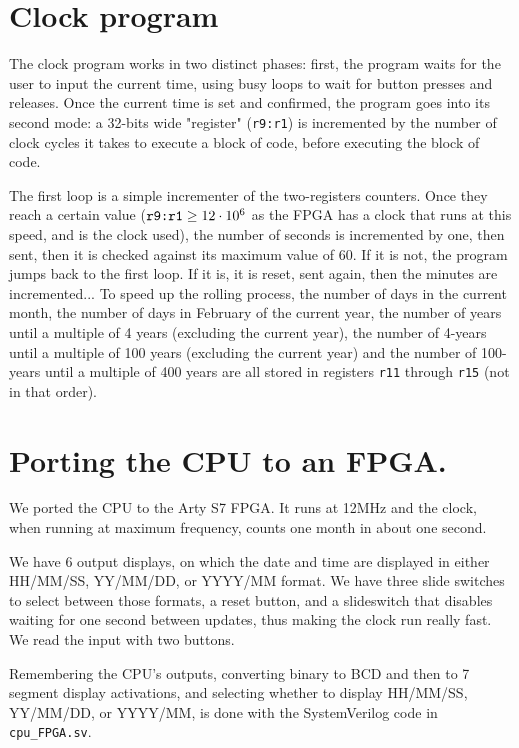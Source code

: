 \documentclass{scrartcl}
\begin{document}
\section*{Clock program}

The clock program works in two distinct phases: first, the program waits for
the user to input the current time, using busy loops to wait for button
presses and releases. Once the current time is set and confirmed, the program
goes into its second mode: a 32-bits wide "register" (\verb+r9:r1+) is
incremented by the number of clock cycles it takes to execute a block of
code, before executing the block of code.\par
The first loop is a simple incrementer of the two-registers counters. Once
they reach a certain value ($\verb+r9:r1+ \geq 12 \cdot 10^6$ as the FPGA has
a clock that runs at this speed, and is the clock used), the number of
seconds is incremented by one, then sent, then it is checked against its
maximum value of $60$. If it is not, the program jumps back to the first
loop. If it is, it is reset, sent again, then the minutes are
incremented...
To speed up the rolling process, the number of days in the current month, the
number of days in February of the current year, the number of years until a
multiple of 4 years (excluding the current year), the number of 4-years until
a multiple of 100 years (excluding the current year) and the number of
100-years until a multiple of 400 years are all stored in registers
\verb+r11+ through \verb+r15+ (not in that order).

\section{Porting the CPU to an FPGA.}

We ported the CPU to the Arty S7 FPGA. It runs at 12MHz and the clock, when running at maximum frequency, counts one month in about one second.

We have 6 output displays, on which the date and time are displayed in either HH/MM/SS, YY/MM/DD, or YYYY/MM format. We have three slide switches to select between those formats, a reset button, and a slideswitch that disables waiting for one second between updates, thus making the clock run really fast. We read the input with two buttons.

Remembering the CPU's outputs, converting binary to BCD and then to 7 segment display activations, and selecting whether to display HH/MM/SS, YY/MM/DD, or YYYY/MM, is done with the SystemVerilog code in \verb|cpu_FPGA.sv|.
\end{document}
